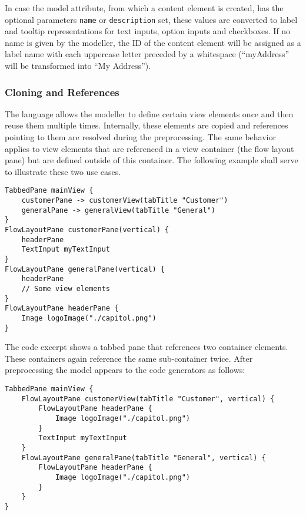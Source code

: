 In case the model attribute, from which a content element is created, has the optional parameters \lstinline!name! or \lstinline!description! set, these values are converted to label and tooltip representations for text inputs, option inputs and checkboxes. If no name is given by the modeller, the ID of the content element will be assigned as a label name with each uppercase letter preceded by a whitespace (\eg \enquote{myAddress} will be transformed into \enquote{My Address}).

\subsubsection{Cloning and References}
The \MD language allows  the modeller to define certain view elements once and then reuse them multiple times. Internally, these elements are copied and references pointing to them are resolved during the preprocessing. The same behavior applies to view elements that are referenced in a view container (\eg the flow layout pane) but are defined outside of this container. The following example shall serve to illustrate these two use cases.

\begin{lstlisting}[language=MD2]
TabbedPane mainView {
	customerPane -> customerView(tabTitle "Customer")
	generalPane -> generalView(tabTitle "General")
}
FlowLayoutPane customerPane(vertical) {
	headerPane
	TextInput myTextInput
}
FlowLayoutPane generalPane(vertical) {
	headerPane
	// Some view elements
}
FlowLayoutPane headerPane {
	Image logoImage("./capitol.png")
}
\end{lstlisting}

The code excerpt shows a tabbed pane that references two container elements. These containers again reference the same sub-container twice. After preprocessing the model appears to the code generators as follows:

\begin{lstlisting}[language=MD2]
TabbedPane mainView {
	FlowLayoutPane customerView(tabTitle "Customer", vertical) {
		FlowLayoutPane headerPane {
			Image logoImage("./capitol.png")
	    }
		TextInput myTextInput
	}
	FlowLayoutPane generalPane(tabTitle "General", vertical) {
		FlowLayoutPane headerPane {
			Image logoImage("./capitol.png")
		}
	}
}
\end{lstlisting}

